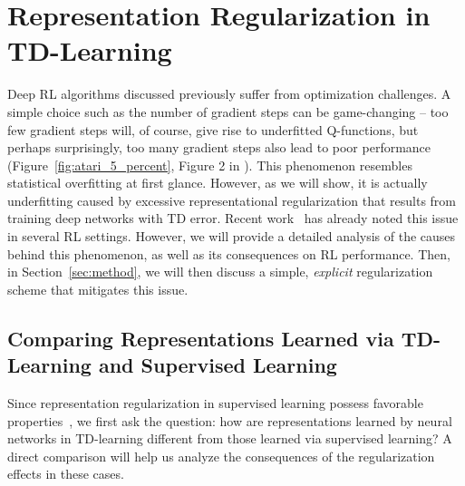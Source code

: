 \section{Representation Regularization in TD-Learning}
\label{sec:problem}

Deep RL algorithms discussed previously suffer from optimization challenges. A simple choice such as the number of gradient steps can be game-changing -- too few gradient steps will, of course, give rise to underfitted Q-functions, but perhaps surprisingly, too many gradient steps also lead to poor performance (Figure~\ref{fig:atari_5_percent}, Figure 2 in \citep{kumar2021implicit}).
This phenomenon resembles statistical overfitting at first glance. However, as we will show, it is actually underfitting caused by excessive representational regularization that results from training deep networks with TD error. Recent work~\citep{kumar2021implicit} has already noted this issue in several RL settings. However, we will provide a detailed analysis of the causes behind this phenomenon, as well as its consequences on RL performance. Then, in Section~\ref{sec:method}, we will then discuss a simple, \textit{explicit} regularization scheme that mitigates this issue.   

\subsection{Comparing Representations Learned via TD-Learning and Supervised Learning}
Since representation regularization in supervised learning possess favorable properties~\citep{arora2018optimization,arora2019implicit},
we first ask the question: how are representations learned by neural networks in TD-learning different from those learned via supervised learning? A direct comparison will help us analyze the consequences of the regularization effects in these cases. 

